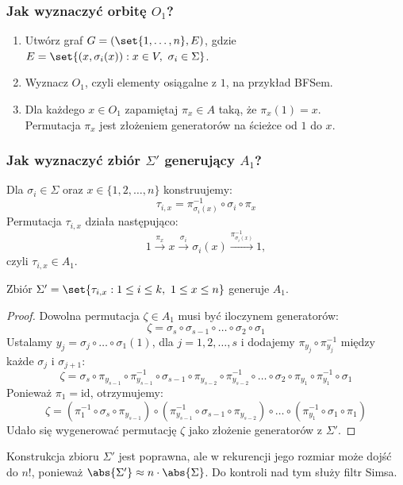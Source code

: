 \newpage
\subsubsection*{Jak wyznaczyć orbitę \(O_1\)?}
\begin{greyframe}
    \begin{enumerate}
        \item Utwórz graf \( G=(\set{1, \ldots, n}, E) \), gdzie \( E = \set{(x, \sigma_i(x)) : x \in V, \ \sigma_i \in \Sigma } \).
        \item Wyznacz \( O_1 \), czyli elementy osiągalne z \( 1 \), na przykład BFSem.
        \item Dla każdego \( x \in O_1 \) zapamiętaj \( \pi_x \in A \) taką, że \( \pi_x(1) = x \). \\
        Permutacja \(\pi_x\) jest złożeniem generatorów na ścieżce od \( 1 \) do \( x \).
    \end{enumerate}
\end{greyframe}

\subsubsection*{Jak wyznaczyć zbiór \(\Sigma'\) generujący \(A_1\)?}
Dla \(\sigma_i \in \Sigma\) oraz \(x \in \{1, 2, \ldots, n\}\) konstruujemy:
\[
    \tau_{i,x} = \pi_{\sigma_i(x)}^{-1} \circ \sigma_i \circ \pi_x
\]
Permutacja \(\tau_{i,x}\) działa następująco:
\[
    1 \xrightarrow{\pi_x} x \xrightarrow{\sigma_i} \sigma_i(x) \xrightarrow{\pi_{\sigma_i(x)}^{-1}} 1,
\]
czyli \(\tau_{i,x} \in A_1\).

\begin{lemma}[Schreiera]
    Zbiór \( \Sigma' = \set{\tau_{i,x} : 1 \leq i \leq k, \ 1 \leq x \leq n} \) generuje \( A_1 \).
\end{lemma}
\begin{proof}
    Dowolna permutacja \(\zeta \in A_1\) musi być iloczynem generatorów:
    \[
        \zeta = \sigma_s \circ \sigma_{s-1} \circ \ldots \circ \sigma_2 \circ \sigma_1
    \]
    Ustalamy \(y_j = \sigma_j \circ \ldots \circ \sigma_1(1)\), dla \(j = 1, 2, \ldots, s\) i dodajemy \(\pi_{y_j} \circ \pi_{y_j}^{-1}\) między każde \(\sigma_j\) i \(\sigma_{j+1}\):
    \[
        \zeta = \sigma_s \circ \pi_{y_{s-1}} \circ \pi_{y_{s-1}}^{-1} \circ \sigma_{s-1} \circ \pi_{y_{s-2}} \circ \pi_{y_{s-2}}^{-1} \circ \ldots \circ \sigma_2 \circ \pi_{y_1} \circ \pi_{y_1}^{-1} \circ \sigma_1
    \]
    Ponieważ \(\pi_1 = \text{id}\), otrzymujemy:
    \[
        \zeta = (\pi_1^{-1} \circ \sigma_s \circ \pi_{y_{s-1}}) \circ (\pi_{y_{s-1}}^{-1} \circ \sigma_{s-1} \circ \pi_{y_{s-2}}) \circ \ldots \circ (\pi_{y_1}^{-1} \circ \sigma_1 \circ \pi_1)
    \]
    Udało się wygenerować permutację \(\zeta\) jako złożenie generatorów z \(\Sigma'\).
\end{proof}
Konstrukcja zbioru \( \Sigma' \) jest poprawna, ale w rekurencji jego rozmiar może dojść do \( n! \), ponieważ \( \abs{\Sigma'} \approx n \cdot \abs{\Sigma} \).
Do kontroli nad tym służy filtr Simsa.

